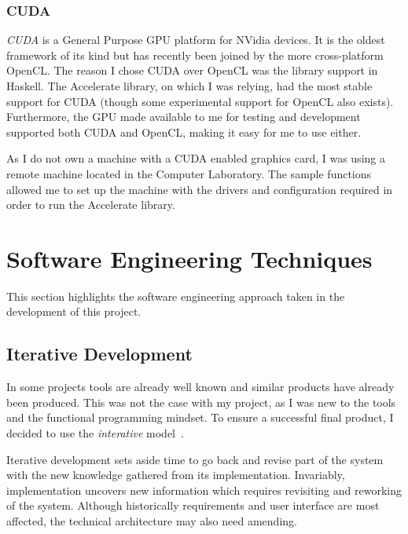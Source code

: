 \documentclass[12pt,a4paper,twoside]{scrbook}
\begin{document}
\subsubsection{CUDA}

\emph{CUDA} is a General Purpose GPU platform for NVidia devices. It is the
oldest framework of its kind but has recently been joined by the more
cross-platform OpenCL. The reason I chose CUDA over OpenCL was the library
support in Haskell. The Accelerate library, on which I was relying, had the most
stable support for CUDA (though some experimental support for OpenCL also
exists). Furthermore, the GPU made available to me for testing and development
supported both CUDA and OpenCL, making it easy for me to use either.

As I do not own a machine with a CUDA enabled graphics card, I was using a
remote machine located in the Computer Laboratory. The sample functions allowed
me to set up the machine with the drivers and configuration required in order to
run the Accelerate library.

\section{Software Engineering Techniques}

This section highlights the software engineering approach taken in the
development of this project.

\subsection{Iterative Development}
\label{sec:iterdev}

In some projects tools are already well known and similar products have already
been produced. This was not the case with my project, as I was new to the tools
and the functional programming mindset. To ensure a successful final product, I
decided to use the \emph{interative} model~\cite{cockburn08}.

Iterative development sets aside time to go back and revise part of the system
with the new knowledge gathered from its implementation. Invariably,
implementation uncovers new information which requires revisiting and reworking
of the system. Although historically requirements and user interface are most
affected, the technical architecture may also need amending.
\end{document}
